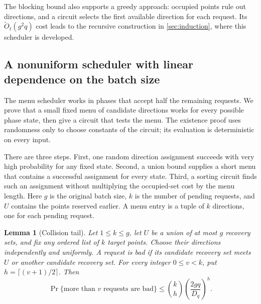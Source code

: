 \documentclass[11pt]{article}
\newtheorem{lemma}[lemma]{Lemma}
\begin{document}
The blocking bound also supports a greedy approach: occupied points rule out
directions, and a circuit selects the first available direction for each
request.  Its $\widetilde O_\ell(g^2q)$ cost leads to the recursive
construction in \cref{sec:induction}, where this scheduler is developed.

\subsection{A nonuniform scheduler with linear dependence on the batch size}
\label{subsec:linear-scheduler}

The menu scheduler works in phases that accept half the remaining requests.
We prove that a small fixed menu of candidate directions works for
every possible phase state, then give a circuit that tests the menu.  The
existence proof uses randomness only to choose constants of the circuit; its
evaluation is deterministic on every input.

There are three steps.  First, one random direction assignment succeeds with
very high probability for any fixed state.  Second, a union bound supplies a
short menu that contains a successful assignment for every state.  Third, a
sorting circuit finds such an assignment without multiplying the occupied-set
cost by the menu length.  Here $g$ is the original batch size, $k$ is the
number of pending requests, and $U$ contains the points reserved earlier.
A menu entry is a tuple of $k$ directions, one for each pending request.

\begin{lemma}[Collision tail]\label{lem:collision-tail}
Let $1\le k\le g$, let $U$ be a union of at most $g$ recovery sets, and
fix any ordered list of $k$ target points.  Choose their directions
independently and uniformly.  A request is bad if its candidate recovery
set meets $U$ or another candidate recovery set.
For every integer $0\le v<k$, put $h=\lceil(v+1)/2\rceil$.  Then
\[
  \Pr\{\text{more than }v\text{ requests are bad}\}
  \le \binom{k}{h}\left(\frac{2gq}{D_q}\right)^h.
\]
\end{lemma}
\end{document}
